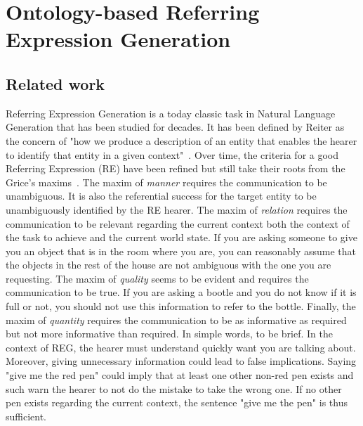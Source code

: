 \ifdefined{}
\else
\setcounter{chapter}{4} %
\dominitoc
\faketableofcontents
\fi

\chapter{Ontology-based Referring Expression Generation}
\minitoc

\section{Related work}

Referring Expression Generation is a today classic task in Natural Language Generation \cite{gatt_2018_survey} that has been studied for decades. It has been defined by Reiter as the concern of "how we produce a description of an entity that enables the hearer to identify that entity in a given context"~\cite{reiter_2000_building}. Over time, the criteria for a good Referring Expression (RE) have been refined but still take their roots from the Grice's maxims~\cite{grice_1975_logic}. The maxim of \textit{manner} requires the communication to be unambiguous. It is also the referential success for the target entity to be unambiguously identified by the RE hearer. The maxim of \textit{relation} requires the communication to be relevant regarding the current context both the context of the task to achieve and the current world state. If you are asking someone to give you an object that is in the room where you are, you can reasonably assume that the objects in the rest of the house are not ambiguous with the one you are requesting. The maxim of \textit{quality} seems to be evident and requires the communication to be true. If you are asking a bootle and you do not know if it is full or not, you should not use this information to refer to the bottle. Finally, the maxim of \textit{quantity} requires the communication to be as informative as required but not more informative than required. In simple words, to be brief. In the context of REG, the hearer must understand quickly want you are talking about. Moreover, giving unnecessary information could lead to false implications. Saying "give me the red pen" could imply that at least one other non-red pen exists and such warn the hearer to not do the mistake to take the wrong one. If no other pen exists regarding the current context, the sentence "give me the pen" is thus sufficient.

